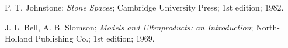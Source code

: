 
P. T. Johnstone;
\textit{Stone Spaces};
Cambridge University Press;
1st edition;
1982.

J. L. Bell, A. B. Slomson;
\textit{Models and Ultraproducts: an Introduction};
North-Holland Publishing Co.;
1st edition;
1969.

